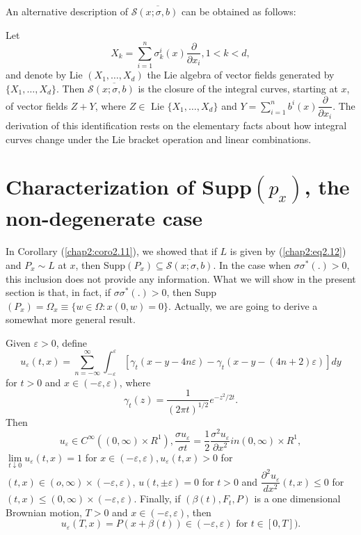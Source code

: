  \setcounter{remark}{15}
\begin{remark}%
 An alternative description of $\mathscr{S} \overline {(x; \sigma,
   b)}$ can be obtained as follows: 

Let\pageoriginale
$$
X_k = \sum^n_{i=1} \sigma^i_k (x) \frac{\partial}{\partial x_i}, 1 < k
< d, 
$$
and denote by Lie $(X_1, \ldots , X_d)$ the Lie algebra of vector
fields generated by $\{ X_1, \ldots , X_d \}$. Then $\mathscr{S}
\overline {(x; \sigma, b)}$ is the closure of the integral curves,
starting at $x$, 
of vector fields $Z + Y$, where $Z \in \text{ Lie } \{ X_1, \ldots ,
X_d \}$ and $Y = \sum\limits^n_{i=1} b^i (x) \dfrac{\partial}{\partial
  x_i}$. The derivation of this identification rests on the elementary
facts about how integral curves change under the Lie bracket operation
and linear combinations. 
 \end{remark}

\section{Characterization of Supp$(p_x)$, the non-degenerate case}

In Corollary (\ref{chap2:coro2.11}), we showed that if $L$ is given by
(\ref{chap2:eq2.12}) and 
$P_x \sim L$ at $x$, then Supp$(P_x) \subseteq \overline{\mathscr{S}(x; \sigma
  , b)}$. In the case when $\sigma \sigma^*(.) > 0$, this inclusion
does not provide any information. What we will show in the present
section is that, in fact, if $\sigma \sigma^*(.) > 0$, then Supp
$(P_x) = \Omega _x \equiv \{ w \in \Omega : x(0 ,w) = 0
\}$. Actually, we are going to derive a somewhat more general result. 

\setcounter{lemma}{0}
\begin{lemma}%
Given $\varepsilon > 0$, define 
\begin{equation*}
u_\varepsilon(t,x) = \sum^\infty_{n = - \infty} \int^\varepsilon_{-
  \varepsilon} [\gamma _t (x - y - 4n \varepsilon) - \gamma_t (x -y-(4
  n + 2) \varepsilon ) ]dy \tag{3.2}\label{chap2:eq3.2}  
\end{equation*}
for $t > 0$ and $x \in (- \varepsilon, \varepsilon)$, where  
$$
\gamma_t(z) = \frac{1}{(2 \pi t)^{1/2}} e^{- z^2/2t}.  
$$
Then
$$
u_\varepsilon \in  C^\infty ((0, \infty)\times R^1), \frac{\sigma
  u_\varepsilon}{\sigma t} = \frac{1}{2} \frac{\sigma^2
  u_\varepsilon}{\partial x^2} in (0, \infty) \times R^1, 
$$
 $\lim\limits_{t \downarrow 0} u_\varepsilon (t,x)=1$\pageoriginale
for $x \in (- 
\varepsilon, \varepsilon), u_\varepsilon(t,x) >0$ for $(t,x) \in
(o,\infty) \times (-\varepsilon, \varepsilon)$, $u(t, \pm
\varepsilon)=0$ for $t > 0$ and
$\dfrac{{\partial^2u}_\varepsilon}{dx^2} (t,x) \le 0$ for $(t,x) \le
(0, \infty) \times (-\varepsilon, \varepsilon)$.
Finally, if $(\beta(t), F_t, P)$ is a one dimensional Brownian motion,
$T > 0$ and  $ x\in  (-\varepsilon, \varepsilon)$, then  
\begin{equation*}
u_\varepsilon(T,x)= P(x+ \beta(t)) \in (-\varepsilon, \varepsilon)
\text{ for } t \in [0,T]).\tag{3.3}\label{chap2:eq3.3}  
 \end{equation*} 
  \end{lemma}

